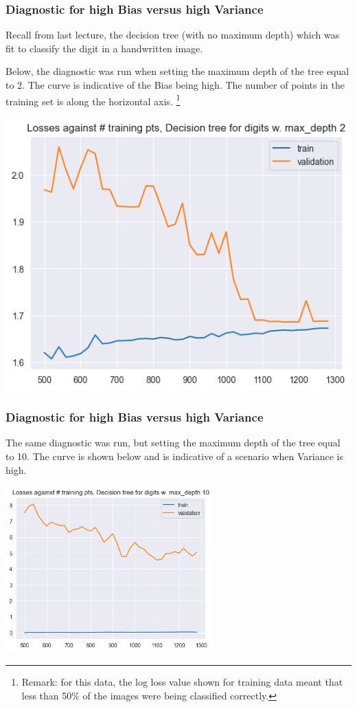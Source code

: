 \documentclass[smaller]{beamer}
\theoremstyle{example}
\begin{document}
\begin{frame}
    \frametitle{Diagnostic for high Bias versus high Variance}
    Recall from last lecture, the decision tree (with no maximum depth) which was fit to classify the digit in a handwritten image. 

    Below, the diagnostic was run when setting the maximum depth of the tree equal to 2. The curve is indicative of the Bias being high. The number of points in the training set is along the horizontal axis. \footnote{Remark: for this data, the log loss value shown for training data meant that less than 50\% of the images were being classified correctly.}

    \pause
    \centering 
    \includegraphics[height=0.45\textheight]{../../Images/high-bias-Tree-DigitsImages.png}
\end{frame}


\begin{frame}
    \frametitle{Diagnostic for high Bias versus high Variance}
    The same diagnostic was run, but setting the maximum depth of the tree equal to 10. The curve is shown below and is indicative of a scenario when Variance is high.

    \vfill

    \centering 
    \includegraphics[width=0.6\textwidth]{../../Images/high-variance-Tree-DigitsImages.png}
\end{frame}
\end{document}
